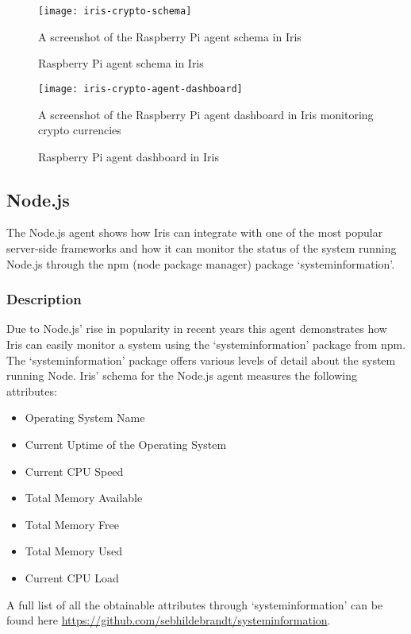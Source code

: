 \documentclass[12pt,a4paper,titlepage]{report}
\begin{document}
\begin{figure}[H]
\begin{tcolorbox}
\begin{center}
\texttt{[image: iris-crypto-schema]}
\end{center}
A screenshot of the Raspberry Pi agent schema in Iris
\end{tcolorbox}
\caption{Raspberry Pi agent schema in Iris}
\end{figure}

\begin{figure}[H]
\begin{tcolorbox}
\begin{center}
\texttt{[image: iris-crypto-agent-dashboard]}
\end{center}
A screenshot of the Raspberry Pi agent dashboard in Iris monitoring crypto currencies
\end{tcolorbox}
\caption{Raspberry Pi agent dashboard in Iris}
\end{figure}

\subsection{Node.js}
The Node.js agent shows how Iris can integrate with one of the most popular server-side frameworks and how it can monitor the status of the system running Node.js through the npm (node package manager) package `systeminformation'.

\subsubsection{Description}
Due to Node.js' rise in popularity in recent years this agent demonstrates how Iris can easily monitor a system using the `systeminformation' package from npm. The `systeminformation' package offers various levels of detail about the system running Node. Iris' schema for the Node.js agent measures the following attributes:
\begin{itemize}
    \item Operating System Name
    \item Current Uptime of the Operating System
    \item Current CPU Speed
    \item Total Memory Available
    \item Total Memory Free
    \item Total Memory Used
    \item Current CPU Load
\end{itemize}
A full list of all the obtainable attributes through `systeminformation' can be found here \url{https://github.com/sebhildebrandt/systeminformation}.
\end{document}
